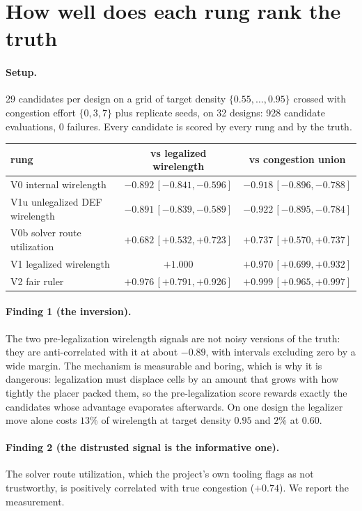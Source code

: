 \documentclass{article}
\begin{document}
\section{How well does each rung rank the truth}
\label{sec:stage1}

\paragraph{Setup.} 29 candidates per design on a grid of target density
$\{0.55,\dots,0.95\}$ crossed with congestion effort $\{0,3,7\}$ plus replicate seeds,
on 32 designs: 928 candidate evaluations, 0 failures. Every candidate is scored by
every rung and by the truth.

\begin{center}
\begin{tabular}{lcc}
\toprule
rung & vs legalized wirelength & vs congestion union \\
\midrule
V0 internal wirelength & $-0.892\,[-0.841,-0.596]$ & $-0.918\,[-0.896,-0.788]$ \\
V1u unlegalized DEF wirelength & $-0.891\,[-0.839,-0.589]$ & $-0.922\,[-0.895,-0.784]$ \\
V0b solver route utilization & $+0.682\,[+0.532,+0.723]$ & $+0.737\,[+0.570,+0.737]$ \\
V1 legalized wirelength & $+1.000$ & $+0.970\,[+0.699,+0.932]$ \\
V2 fair ruler & $+0.976\,[+0.791,+0.926]$ & $+0.999\,[+0.965,+0.997]$ \\
\bottomrule
\end{tabular}
\end{center}

\paragraph{Finding 1 (the inversion).} The two pre-legalization wirelength signals are
not noisy versions of the truth: they are anti-correlated with it at about $-0.89$,
with intervals excluding zero by a wide margin. The mechanism is measurable and
boring, which is why it is dangerous: legalization must displace cells by an amount
that grows with how tightly the placer packed them, so the pre-legalization score
rewards exactly the candidates whose advantage evaporates afterwards. On one design
the legalizer move alone costs $13\%$ of wirelength at target density $0.95$ and $2\%$
at $0.60$.

\paragraph{Finding 2 (the distrusted signal is the informative one).} The solver
route utilization, which the project's own tooling flags as not trustworthy, is
positively correlated with true congestion ($+0.74$). We report the measurement.
\end{document}
